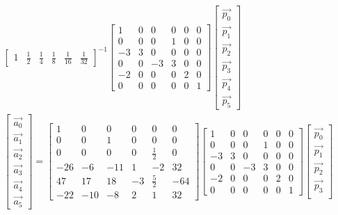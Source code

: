 \documentclass{letter}
\begin{document}
\begin{align*}
\begin{bmatrix}
1 & \frac{1}{2} & \frac{1}{4} & \frac{1}{8} & \frac{1}{16} & \frac{1}{32} 
\end{bmatrix}^{-1}
\begin{bmatrix}
1 & 0 & 0 & 0 & 0 & 0 \\
0 & 0 & 0 & 1 & 0 & 0 \\
-3 & 3 & 0 & 0 & 0 & 0 \\
0 & 0 & -3 & 3 & 0 & 0 \\
-2 & 0 & 0 & 0 & 2 & 0 \\
0 & 0 & 0 & 0 & 0 & 1
\end{bmatrix}
\begin{bmatrix}
\vec{p_0} \\
\vec{p_1} \\
\vec{p_2} \\
\vec{p_3} \\
\vec{p_4} \\
\vec{p_5} 
\end{bmatrix}
\\
\begin{bmatrix}
\vec{a_0} \\
\vec{a_1} \\
\vec{a_2} \\
\vec{a_3} \\
\vec{a_4} \\
\vec{a_5} 
\end{bmatrix}
=
\begin{bmatrix}
1 & 0 & 0 & 0 & 0 & 0 \\
0 & 0 & 1 & 0 & 0 & 0 \\
0 & 0 & 0 & 0 & \frac{1}{2} & 0 \\
-26 & -6 & -11 & 1 & -2 & 32 \\
47 & 17 & 18 & -3 & \frac{5}{2} & -64 \\
-22 & -10 & -8 & 2 & 1 & 32
\end{bmatrix}
\begin{bmatrix}
1 & 0 & 0 & 0 & 0 & 0 \\
0 & 0 & 0 & 1 & 0 & 0 \\
-3 & 3 & 0 & 0 & 0 & 0 \\
0 & 0 & -3 & 3 & 0 & 0 \\
-2 & 0 & 0 & 0 & 2 & 0 \\
0 & 0 & 0 & 0 & 0 & 1
\end{bmatrix}
\begin{bmatrix}
\vec{p_0} \\
\vec{p_1} \\
\vec{p_2} \\
\vec{p_3} \\

\end{bmatrix}
\end{align*}
\end{document}
